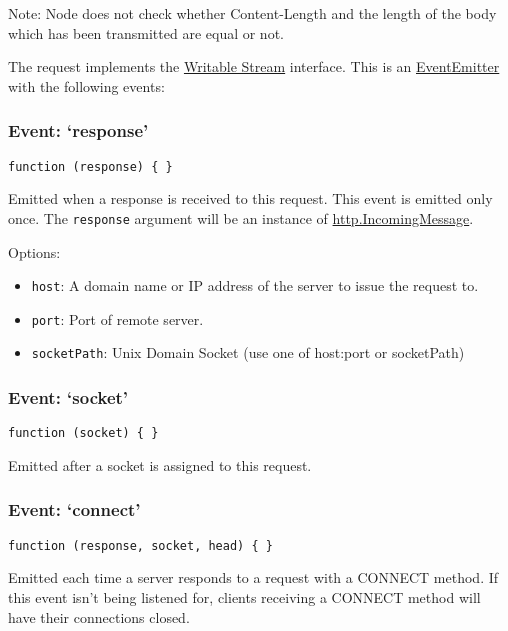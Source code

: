 Note: Node does not check whether Content-Length and the length of the
body which has been transmitted are equal or not.

The request implements the
\href{stream.html\#stream_class_stream_writable}{Writable Stream}
interface. This is an
\href{events.html\#events_class_events_eventemitter}{EventEmitter} with
the following events:

\subsubsection{\texorpdfstring{Event:
`response'}{Event: response}}\label{event-response}

\texttt{function\ (response)\ \{\ \}}

Emitted when a response is received to this request. This event is
emitted only once. The \texttt{response} argument will be an instance of
\hyperref[httpux5fhttpux5fincomingmessage]{http.IncomingMessage}.

Options:

\begin{itemize}
\itemsep1pt\parskip0pt
\item
  \texttt{host}: A domain name or IP address of the server to issue the
  request to.
\item
  \texttt{port}: Port of remote server.
\item
  \texttt{socketPath}: Unix Domain Socket (use one of host:port or
  socketPath)
\end{itemize}

\subsubsection{\texorpdfstring{Event:
`socket'}{Event: socket}}\label{event-socket}

\texttt{function\ (socket)\ \{\ \}}

Emitted after a socket is assigned to this request.

\subsubsection{\texorpdfstring{Event:
`connect'}{Event: connect}}\label{event-connect-1}

\texttt{function\ (response,\ socket,\ head)\ \{\ \}}

Emitted each time a server responds to a request with a CONNECT method.
If this event isn't being listened for, clients receiving a CONNECT
method will have their connections closed.

